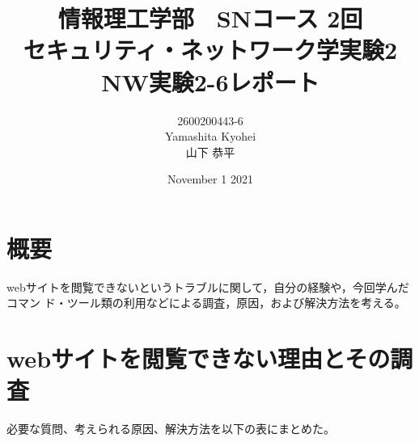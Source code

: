 \documentclass[dvipdfmx,autodetect-engine,titlepage]{jsarticle}
\title{情報理工学部　SNコース 2回\\
セキュリティ・ネットワーク学実験2\\
NW実験2-6レポート}
\author{2600200443-6\\Yamashita Kyohei\\山下 恭平}
\date{November 1 2021}
\begin{document}
\maketitle

\section{概要}
webサイトを閲覧できないというトラブルに関して，自分の経験や，今回学んだコマン
ド・ツール類の利用などによる調査，原因，および解決方法を考える。

\section{webサイトを閲覧できない理由とその調査}
必要な質問、考えられる原因、解決方法を以下の表にまとめた。
\end{document}

